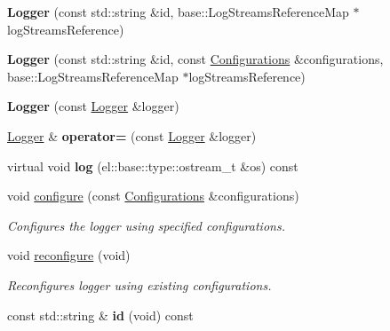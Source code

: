 \begin{DoxyCompactItemize}
\item 
\hypertarget{a00048_a59b1c5a0f8c5c670e59d2f69f9e39fbb}{}{\bfseries Logger} (const std\+::string \&id, base\+::\+Log\+Streams\+Reference\+Map $\ast$log\+Streams\+Reference)\label{a00048_a59b1c5a0f8c5c670e59d2f69f9e39fbb}

\item 
\hypertarget{a00048_a43abea8865d7316f05c8a676a8c04896}{}{\bfseries Logger} (const std\+::string \&id, const \hyperlink{a00014}{Configurations} \&configurations, base\+::\+Log\+Streams\+Reference\+Map $\ast$log\+Streams\+Reference)\label{a00048_a43abea8865d7316f05c8a676a8c04896}

\item 
\hypertarget{a00048_a984de07936a8c783e91496dfa6df69ea}{}{\bfseries Logger} (const \hyperlink{a00048}{Logger} \&logger)\label{a00048_a984de07936a8c783e91496dfa6df69ea}

\item 
\hypertarget{a00048_a2bfb4ed37f3281a701f20fb21a4cac62}{}\hyperlink{a00048}{Logger} \& {\bfseries operator=} (const \hyperlink{a00048}{Logger} \&logger)\label{a00048_a2bfb4ed37f3281a701f20fb21a4cac62}

\item 
\hypertarget{a00048_a12e1e5f6f91bad8d6a71c3918f09b672}{}virtual void {\bfseries log} (el\+::base\+::type\+::ostream\+\_\+t \&os) const \label{a00048_a12e1e5f6f91bad8d6a71c3918f09b672}

\item 
\hypertarget{a00048_ad9db621dbf8977bf814dc7baea8dcee4}{}void \hyperlink{a00048_ad9db621dbf8977bf814dc7baea8dcee4}{configure} (const \hyperlink{a00014}{Configurations} \&configurations)\label{a00048_ad9db621dbf8977bf814dc7baea8dcee4}

\begin{DoxyCompactList}\small\item\em Configures the logger using specified configurations. \end{DoxyCompactList}\item 
\hypertarget{a00048_adfd57ab27fb398cc980a3edfab92927e}{}void \hyperlink{a00048_adfd57ab27fb398cc980a3edfab92927e}{reconfigure} (void)\label{a00048_adfd57ab27fb398cc980a3edfab92927e}

\begin{DoxyCompactList}\small\item\em Reconfigures logger using existing configurations. \end{DoxyCompactList}\item 
\hypertarget{a00048_ae51a621df3c835f51f450134ba66f8ac}{}const std\+::string \& {\bfseries id} (void) const \label{a00048_ae51a621df3c835f51f450134ba66f8ac}


\end{DoxyCompactItemize}
